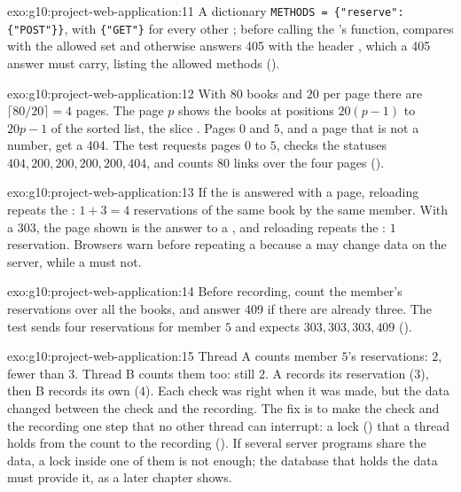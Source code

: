 \begin{solution}{exo:g10:project-web-application:11}
A dictionary \texttt{METHODS = \{"reserve": \{"POST"\}\}}, with \texttt{\{"GET"\}} for every other ; before calling
the 's function,  compares  with the allowed set and otherwise answers
405 with the header , which a 405 answer must carry, listing the allowed methods
().
\end{solution}

\begin{solution}{exo:g10:project-web-application:12}
With $80$ books and $20$ per page there are $\lceil 80/20 \rceil = 4$ pages. The page $p$ shows the books at
positions $20(p-1)$ to $20p - 1$ of the sorted list, the slice . Pages $0$ and
$5$, and a page that is not a number, get a 404. The test requests pages $0$ to $5$, checks the statuses
$404, 200, 200, 200, 200, 404$, and counts $80$ links over the four pages ().
\end{solution}

\begin{solution}{exo:g10:project-web-application:13}
If the  is answered with a page, reloading repeats the : $1 + 3 = 4$ reservations of the same book by the
same member. With a 303, the page shown is the answer to a , and reloading repeats the : $1$ reservation.
Browsers warn before repeating a  because a  may change data on the server, while a  must not.
\end{solution}

\begin{solution}{exo:g10:project-web-application:14}
Before recording, count the member's reservations over all the books, and answer 409 if there are already three. The
test sends four reservations for member $5$ and expects $303, 303, 303, 409$ ().
\end{solution}

\begin{solution}{exo:g10:project-web-application:15}
Thread A counts member $5$'s reservations: $2$, fewer than $3$. Thread B counts them too: still $2$. A records its
reservation ($3$), then B records its own ($4$). Each check was right when it was made, but the data changed between
the check and the recording. The fix is to make the check and the recording one step that no other thread can
interrupt: a lock () that a thread holds from the count to the recording
(). If several server programs share the data, a lock inside one of them is not enough;
the database that holds the data must provide it, as a later chapter shows.
\end{solution}
